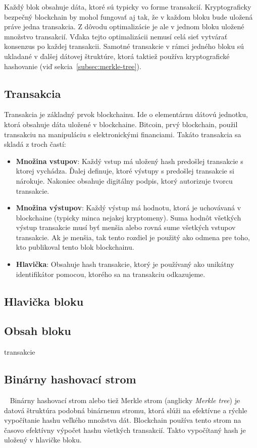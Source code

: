 Každý blok obsahuje dáta, ktoré sú typicky vo forme transakcií. Kryptograficky bezpečný blockchain by mohol fungovať aj tak, že v každom bloku bude uložená práve jedna transakcia. Z dôvodu optimalizácie je ale v jednom bloku uložené množstvo transakcií. Vďaka tejto optimalizácii nemusí celá sieť vytvárať konsenzus po každej transakcii. Samotné transakcie v rámci jedného bloku sú ukladané v ďalšej dátovej štruktúre, ktorá taktiež používa kryptografické hashovanie (viď sekcia~\ref{subsec:merkle-tree}).~\cite{narayanan2016bitcoin}

\subsection{Transakcia}
Transakcia je základný prvok blockchainu. Ide o elementárnu dátovú jednotku, ktorá obsahuje dáta uložené v blockchaine. Bitcoin, prvý blockchain, použil transakciu na manipuláciu s elektronickými financiami. Takáto transakcia sa skladá z troch častí:
\begin{itemize}
	\item \textbf{Množina vstupov}: Každý vstup má uložený hash predošlej transakcie s ktorej vychádza. Ďalej definuje, ktoré výstupy s predošlej transakcie si nárokuje. Nakoniec obsahuje digitálny podpis, ktorý autorizuje tvorcu transakcie.
	\item \textbf{Množina výstupov}: Každý výstup má hodnotu, ktorá je uchovávaná v blockchaine (typicky minca nejakej kryptomeny). Suma hodnôt všetkých výstup transakcie musí byť menšia alebo rovná sume všetkých vstupov transakcie. Ak je menšia, tak tento rozdiel je použitý ako odmena pre toho, kto publikoval tento blok blockchainu.
	\item \textbf{Hlavička}: Obsahuje hash transakcie, ktorý je používaný ako unikátny identifikátor pomocou, ktorého sa na transakciu odkazujeme.
\end{itemize}

\subsection{Hlavička bloku}

\subsection{Obsah bloku}
transakcie


\subsection{Binárny hashovací strom}~\label{subsec:merkle-tree}
Binárny hashovací strom alebo tiež Merkle strom (anglicky \textit{Merkle tree}) je datová štruktúra podobná binárnemu stromu, ktorá slúži na efektívne a rýchle vypočítanie hashu veľkého množstva dát. Blockchain používa tento strom na časovo efektívny výpočet hashu všetkých transakcií. Takto vypočítaný hash je uložený v hlavičke bloku.

